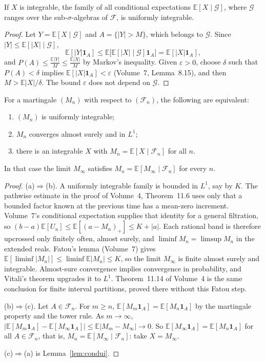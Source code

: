 \begin{lemma}\label{lem:condui}
If $X$ is integrable, the family of all conditional expectations $\mathbb E[X\mid\mathcal G]$, where $\mathcal G$ ranges over the sub-$\sigma$-algebras of $\mathcal F$, is uniformly integrable.
\end{lemma}
\begin{proof}
Let $Y=\mathbb E[X\mid\mathcal G]$ and $A=\{|Y|>M\}$, which belongs to $\mathcal G$. Since $|Y|\le\mathbb E[|X|\mid\mathcal G]$,
\[
\mathbb E[|Y|\mathbf 1_A]\le\mathbb E\bigl[\mathbb E[|X|\mid\mathcal G]\mathbf 1_A\bigr]=\mathbb E[|X|\mathbf 1_A],
\]
and $P(A)\le\frac{\mathbb E|Y|}M\le\frac{\mathbb E|X|}M$ by Markov's inequality. Given $\varepsilon>0$, choose $\delta$ such that $P(A)<\delta$ implies $\mathbb E[|X|\mathbf 1_A]<\varepsilon$ (Volume~7, Lemma~8.15), and then
$M>\mathbb E|X|/\delta$. The bound $\varepsilon$ does not depend on $\mathcal G$.
\end{proof}

\begin{theorem}\label{thm:uimart}
For a martingale $(M_n)$ with respect to $(\mathcal F_n)$, the following are equivalent:
\begin{enumerate}[label=(\alph*)]
\item $(M_n)$ is uniformly integrable;
\item $M_n$ converges almost surely and in $L^1$;
\item there is an integrable $X$ with $M_n=\mathbb E[X\mid\mathcal F_n]$ for all $n$.
\end{enumerate}
In that case the limit $M_\infty$ satisfies $M_n=\mathbb E[M_\infty\mid\mathcal F_n]$ for every $n$.
\end{theorem}
\begin{proof}
(a)$\Rightarrow$(b). A uniformly integrable family is bounded in $L^1$, say by $K$. The pathwise estimate in the proof of Volume~4, Theorem~11.6 uses only that a bounded factor known at the previous time has a mean-zero increment. Volume~7's conditional expectation supplies that identity for a general filtration, so $(b-a)\mathbb E[U_n]\le\mathbb E[(a-M_n)_+]\le K+|a|$. Each rational band is therefore upcrossed only finitely often, almost surely, and $\liminf M_n=\limsup M_n$ in the extended reals. Fatou's lemma (Volume~7) gives $\mathbb E[\liminf|M_n|]\le\liminf\mathbb E|M_n|\le K$, so the limit $M_\infty$ is finite almost surely and integrable. Almost-sure convergence implies convergence in probability, and Vitali's theorem upgrades it to $L^1$. Theorem~11.14 of Volume~4 is the same conclusion for finite interval partitions, proved there without this Fatou step.

(b)$\Rightarrow$(c). Let $A\in\mathcal F_n$. For $m\ge n$, $\mathbb E[M_m\mathbf 1_A]=\mathbb E[M_n\mathbf 1_A]$ by the martingale property and the tower rule. As $m\to\infty$,
$|\mathbb E[M_m\mathbf 1_A]-\mathbb E[M_\infty\mathbf 1_A]|\le\mathbb E|M_m-M_\infty|\to0$. So $\mathbb E[M_\infty\mathbf 1_A]=\mathbb E[M_n\mathbf 1_A]$ for all $A\in\mathcal F_n$, that is, $M_n=\mathbb E[M_\infty\mid\mathcal F_n]$: take $X=M_\infty$.

(c)$\Rightarrow$(a) is Lemma~\ref{lem:condui}.
\end{proof}

